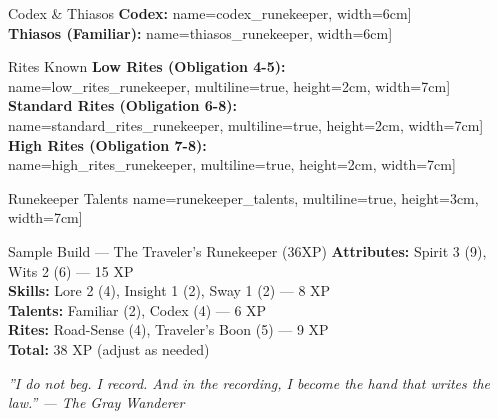 \documentclass[10pt]{article}
\newcommand{\tf}[1]{\TextField[#1]{}}
\begin{document}
\begin{Form}
\begin{minipage}[t]{0.48\linewidth}
    \begin{charbox}{Codex \& Thiasos}
        \textbf{Codex:} \tf[name=codex_runekeeper, width=6cm]{} \\
        \textbf{Thiasos (Familiar):} \tf[name=thiasos_runekeeper, width=6cm]{}
    \end{charbox}
\end{minipage}
\hfill
\begin{minipage}[t]{0.48\linewidth}
    \begin{charbox}{Rites Known}
        \textbf{Low Rites (Obligation 4-5):}\\
        \tf[name=low_rites_runekeeper, multiline=true, height=2cm, width=7cm]{} \\
        \textbf{Standard Rites (Obligation 6-8):}\\
        \tf[name=standard_rites_runekeeper, multiline=true, height=2cm, width=7cm]{} \\
        \textbf{High Rites (Obligation 7-8):}\\
        \tf[name=high_rites_runekeeper, multiline=true, height=2cm, width=7cm]{}
    \end{charbox}
    
    \vspace{0.5em}
    
    \begin{charbox}{Runekeeper Talents}
        \tf[name=runekeeper_talents, multiline=true, height=3cm, width=7cm]{}%
    \end{charbox}
    
    \vspace{0.5em}
    
    \begin{charbox}{Sample Build --- The Traveler's Runekeeper (36XP)}
        \textbf{Attributes:} Spirit 3 (9), Wits 2 (6) --- 15 XP\\
        \textbf{Skills:} Lore 2 (4), Insight 1 (2), Sway 1 (2) --- 8 XP\\
        \textbf{Talents:} Familiar (2), Codex (4) --- 6 XP\\
        \textbf{Rites:} Road-Sense (4), Traveler's Boon (5) --- 9 XP\\
        \textbf{Total:} 38 XP (adjust as needed)
    \end{charbox}
\end{minipage}

\vspace{0.5em}
\begin{center}
    {\small\sffamily\itshape ''I do not beg. I record. And in the recording, I become the hand that writes the law.'' --- The Gray Wanderer}
    

\end{center}
\end{Form}
\end{document}
